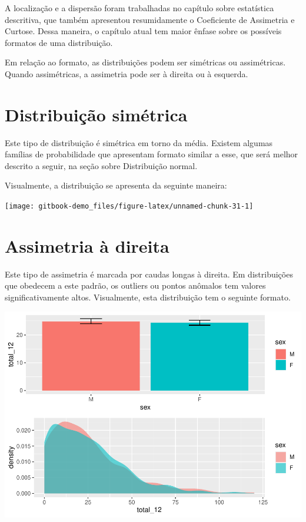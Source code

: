 \documentclass[
]{book}
\begin{document}
A localização e a dispersão foram trabalhadas no capítulo sobre estatística descritiva, que também apresentou resumidamente o Coeficiente de Assimetria e Curtose. Dessa maneira, o capítulo atual tem maior ênfase sobre os possíveis formatos de uma distribuição.

Em relação ao formato, as distribuições podem ser simétricas ou assimétricas. Quando assimétricas, a assimetria pode ser à direita ou à esquerda.

\hypertarget{distribuiuxe7uxe3o-simuxe9trica}{%
\section{Distribuição simétrica}\label{distribuiuxe7uxe3o-simuxe9trica}}

Este tipo de distribuição é simétrica em torno da média. Existem algumas famílias de probabilidade que apresentam formato similar a esse, que será melhor descrito a seguir, na seção sobre Distribuição normal.

Visualmente, a distribuição se apresenta da seguinte maneira:

\begin{center}\texttt{[image: gitbook-demo\_files/figure-latex/unnamed-chunk-31-1]} \end{center}

\hypertarget{assimetria-uxe0-direita}{%
\section{Assimetria à direita}\label{assimetria-uxe0-direita}}

Este tipo de assimetria é marcada por caudas longas à direita. Em distribuições que obedecem a este padrão, os outliers ou pontos anômalos tem valores significativamente altos. Visualmente, esta distribuição tem o seguinte formato.

\begin{center}\includegraphics{gitbook-demo_files/figure-latex/unnamed-chunk-32-1} \end{center}
\end{document}
